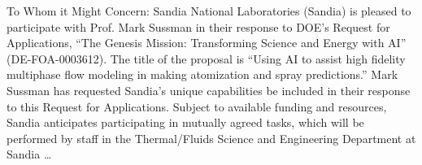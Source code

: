To Whom it Might Concern:
Sandia National Laboratories (Sandia) is pleased to participate with Prof. Mark Sussman in their response to DOE’s Request
for Applications, “The Genesis Mission: Transforming Science and Energy with AI” (DE-FOA-0003612). The title of
the proposal is “Using AI to assist high fidelity multiphase flow modeling in making atomization and spray predictions.”
Mark Sussman has requested Sandia’s unique capabilities be included in their response to this Request for Applications.
Subject to available funding and resources, Sandia anticipates participating in mutually agreed tasks, which will be
performed by staff in the Thermal/Fluids Science and Engineering Department at Sandia …

